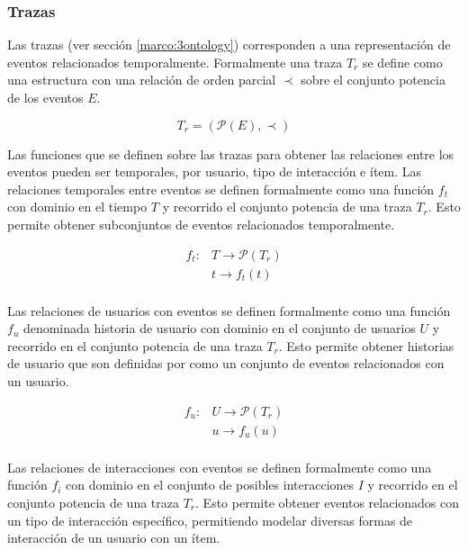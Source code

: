 \subsubsection{Trazas}

Las trazas (ver sección \ref{marco:3ontology}) corresponden a una representación de eventos relacionados temporalmente. Formalmente una traza $T_r$ se define como una estructura con una relación de orden parcial $\prec$ sobre el conjunto potencia de los eventos $E$. 

\begin{equation}
\label{modelo:trazas}
	T_r = (\mathcal{P}(E),\prec)
\end{equation}

Las funciones que se definen sobre las trazas para obtener las relaciones entre los eventos pueden ser temporales, por usuario, tipo de interacción e ítem. Las relaciones temporales entre eventos se definen formalmente como una función $f_t$ con dominio en el tiempo $T$  y recorrido el conjunto potencia de una traza $T_r$. Esto permite obtener subconjuntos de eventos relacionados temporalmente.

\begin{equation}
\label{modelo:operaciontemporal}
	\begin{aligned}
		f_t\colon& T \rightarrow \mathcal{P}(T_r)\\
		& t \rightarrow f_t(t)\\
	\end{aligned}
\end{equation}

Las relaciones de usuarios con eventos se definen formalmente como una función $f_u$ denominada historia de usuario con dominio en el conjunto de usuarios $U$  y recorrido en el conjunto potencia de una traza $T_r$. Esto permite obtener historias de usuario que son definidas por \cite{Ekstrand:2011} como un conjunto de eventos relacionados con un usuario.

\begin{equation}
\label{modelo:operacionusuarios}
	\begin{aligned}
		f_u\colon& U \rightarrow \mathcal{P}(T_r)\\
		& u \rightarrow f_u(u)\\
	\end{aligned}
\end{equation}

Las relaciones de interacciones con eventos se definen formalmente como una función $f_i$ con dominio en el conjunto de posibles interacciones $I$  y recorrido en el conjunto potencia de una traza $T_r$. Esto permite obtener eventos relacionados con un tipo de interacción específico, permitiendo modelar diversas formas de interacción de un usuario con un ítem.

